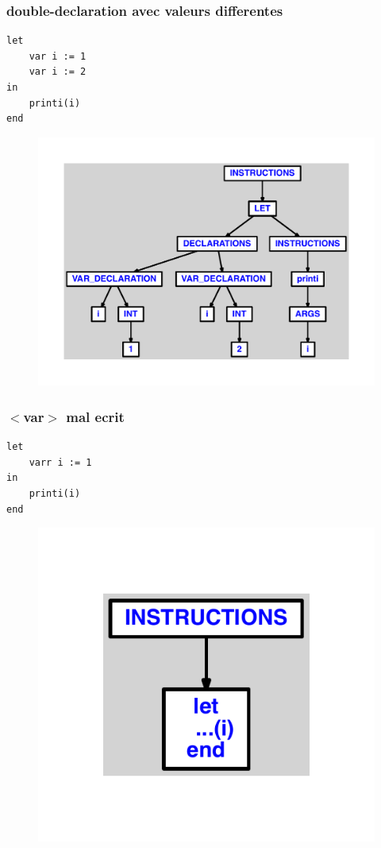 \documentclass{article}
\begin{document}
\subsubsection{double-declaration avec valeurs differentes}
\begin{lstlisting}
let
	var i := 1
	var i := 2
in
	printi(i)
end
\end{lstlisting}
\newpage
\begin{figure}[H]
\centering
\includegraphics[max width=\textwidth]{ast/ast_295.pdf}
\end{figure}
\newpage
\subsubsection{$ < $var$ > $ mal ecrit}
\begin{lstlisting}
let
	varr i := 1
in
	printi(i)
end
\end{lstlisting}
\newpage
\begin{figure}[H]
\centering
\includegraphics[max width=\textwidth]{ast/ast_296.pdf}
\end{figure}
\newpage
\end{document}
